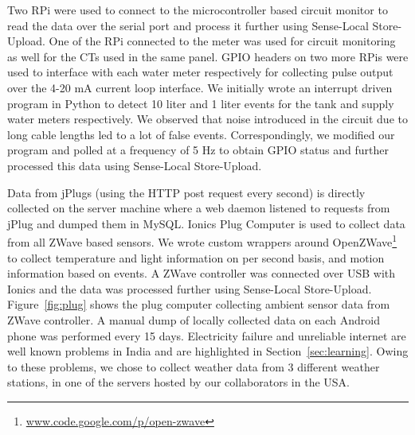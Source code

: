 \documentclass[10pt]{sensys-proc}
\newcommand{\figref}[1]{Figure~\ref{#1}}
\newcommand{\secref}[1]{Section~\ref{#1}}
\newcommand{\paradigm}{Sense-Local Store-Upload}
\begin{document}
Two RPi were used to connect to the microcontroller based circuit monitor to read the data over the serial port and process it further using \paradigm. One of the RPi connected to the meter was used for circuit monitoring as well for the CTs used in the same panel. GPIO headers on two more RPis were used to interface with each water meter respectively for collecting pulse output over the 4-20 mA current loop interface. We initially wrote an interrupt driven program in Python to detect 10 liter and 1 liter events for the tank and supply water meters respectively. We observed that noise introduced in the circuit due to long cable lengths led to a lot of false events. Correspondingly, we modified our program and polled at a frequency of 5 Hz to obtain GPIO status and further processed this data using \paradigm.	 

Data from jPlugs (using the HTTP post request every second) is directly collected on the server machine where a web daemon listened to requests from jPlug and dumped them in MySQL. Ionics Plug Computer is used to collect data from all ZWave based sensors. We wrote custom wrappers around OpenZWave\footnote{\url{www.code.google.com/p/open-zwave}} to collect temperature and light information on per second basis, and motion information based on events. A ZWave controller was connected over USB with Ionics and the data was processed further using \paradigm. \figref{fig:plug} shows the plug computer collecting ambient sensor data from ZWave controller. A manual dump of locally collected data on each Android phone was performed every 15 days. Electricity failure and unreliable internet are well known problems in India and are highlighted in \secref{sec:learning}. Owing to these problems, we chose to collect weather data from 3 different weather stations, in one of the servers hosted by our collaborators in the USA. 



\end{document}
